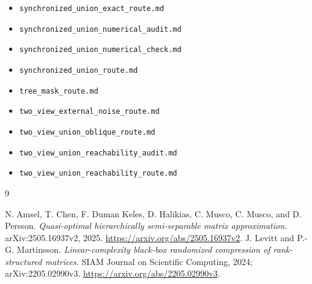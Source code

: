 \documentclass[11pt,oneside,openany,a4paper]{report}
\numberwithin{equation}{chapter}
\theoremstyle{definition}
\theoremstyle{remark}
\newcommand{\sourcefile}[1]{{\small\nolinkurl{#1}}}
\begin{document}
\begin{itemize}[leftmargin=1.3em,itemsep=1pt,topsep=3pt]
\item \sourcefile{synchronized_union_exact_route.md}
\item \sourcefile{synchronized_union_numerical_audit.md}
\item \sourcefile{synchronized_union_numerical_check.md}
\item \sourcefile{synchronized_union_route.md}
\item \sourcefile{tree_mask_route.md}
\item \sourcefile{two_view_external_noise_route.md}
\item \sourcefile{two_view_union_oblique_route.md}
\item \sourcefile{two_view_union_reachability_audit.md}
\item \sourcefile{two_view_union_reachability_route.md}
\end{itemize}
\begin{thebibliography}{9}
N. Amsel, T. Chen, F. Duman Keles, D. Halikias, C. Musco, C. Musco, and D. Persson.
\emph{Quasi-optimal hierarchically semi-separable matrix approximation}.
arXiv:2505.16937v2, 2025.
\url{https://arxiv.org/abs/2505.16937v2}.
J. Levitt and P.-G. Martinsson.
\emph{Linear-complexity black-box randomized compression of rank-structured matrices}.
SIAM Journal on Scientific Computing, 2024; arXiv:2205.02990v3.
\url{https://arxiv.org/abs/2205.02990v3}.
\end{thebibliography}
\end{document}

